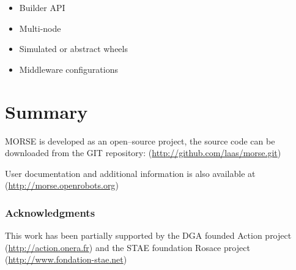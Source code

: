 \documentclass{llncs}
\begin{document}
\begin{itemize}
  \item Builder API
  \item Multi-node
  \item Simulated or abstract wheels
  \item Middleware configurations
\end{itemize}

\section{Summary}
\label{section:discussion}


MORSE is developed as an open--source project, the source code can be
downloaded from the GIT repository:
(\url{http://github.com/laas/morse.git})

User documentation and additional information is also available at
(\url{http://morse.openrobots.org})


\subsubsection*{Acknowledgments}
This work has been partially supported by the DGA founded Action project
(\url{http://action.onera.fr}) and the STAE foundation Rosace project\\
(\url{http://www.fondation-stae.net})



\end{document}
